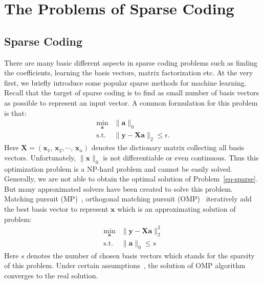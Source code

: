 \section{The Problems of Sparse Coding}
\subsection{Sparse Coding}
There are many basic different aspects in sparse coding problems such as finding the coefficients, learning the basis vectors, matrix factorization etc.
At the very first, we briefly introduce some popular sparse methods for machine learning.
Recall that the target of sparse coding is to find as small number of basis vectors as possible to represent an input vector.
A common formulation for this problem is that:
\begin{equation}
\begin{array}{cl}
\min_{\mathbf{a}} & \|\mathbf{a}\|_0\\
\mathrm{s.t.} & \|\mathbf{y}-\mathbf{X}\mathbf{a}\|_2 \leq \epsilon.
\end{array}
\label{eq-sparse}
\end{equation}
Here $\mathbf{X}=(\mathbf{x}_1,\,\mathbf{x}_2,\cdots ,\,\mathbf{x}_n)$ denotes the dictionary matrix collecting all basis vectors.
Unfortunately, $\|\mathbf{x}\|_0$ is not differentiable or even continuous.
Thus this optimization problem is a NP-hard problem and cannot be easily solved.
Generally, we are not able to obtain the optimal solution of Problem~\ref{eq-sparse}.
But many approximated solvers have been created to solve this problem.
Matching pursuit (MP)~\cite{mallat1993matching}, orthogonal matching pursuit (OMP)~\cite{pati1993orthogonal,tropp2007signal} iteratively add the best basis vector to represent $\mathbf{x}$ which is an approximating solution of problem:
\begin{equation}
\begin{array}{cl}
\min_{\mathbf{a}} & \|\mathbf{y}-\mathbf{X}\mathbf{a}\|_2^2 \\
\mathrm{s.t.} & \|\mathbf{a}\|_0 \leq s
\end{array}
\end{equation}
Here $s$ denotes the number of chosen basis vectors which stands for the sparsity of this problem.
Under certain assumptions~\cite{pati1993orthogonal}, the solution of OMP algorithm converges to the real solution.


